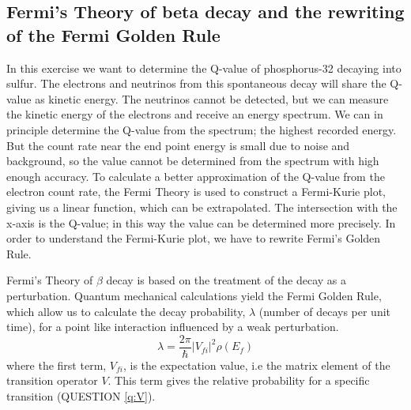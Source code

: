 \documentclass[a4,11pt, notitlepage]{article}
\begin{document}
%
%
%


\subsection{Fermi's Theory of beta decay and the rewriting of the Fermi Golden Rule}

In this exercise we want to determine the Q-value of phosphorus-32 decaying into sulfur. The electrons and neutrinos from this spontaneous decay will share the Q-value as kinetic energy. The neutrinos cannot be detected, but we can measure the kinetic energy of the electrons and receive an energy spectrum. We can in principle determine the Q-value from the spectrum; the highest recorded energy. But the count rate near the end point energy is small due to noise and background, so the value cannot be determined from the spectrum with high enough accuracy. To calculate a better approximation of the Q-value from the electron count rate, the Fermi Theory is used to construct a Fermi-Kurie plot, giving us a linear function, which can be extrapolated. The intersection with the x-axis is the Q-value; in this way the value can be determined more precisely. In order to understand the Fermi-Kurie plot, we have to rewrite Fermi's Golden Rule.

Fermi's Theory of $\beta$ decay is based on the treatment of the decay as a perturbation. Quantum mechanical calculations yield the Fermi Golden Rule, which allow us to calculate the decay probability, $\lambda$ (number of decays per unit time), for a point like interaction influenced by a weak perturbation. 
\begin{equation}
\lambda = \frac{2\pi}{\hbar}|V_{fi}|^2 \rho(E_{f})
\end{equation}
where the first term, $V_{fi}$, is the expectation value, i.e the matrix element of the transition operator $V$. This term gives the relative probability for a specific transition (QUESTION \ref{q:V}).
\end{document}
